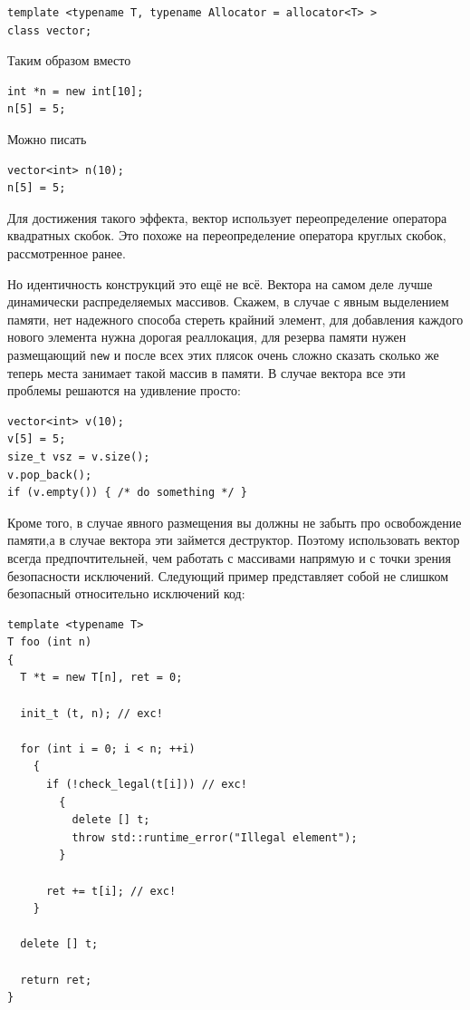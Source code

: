 \documentclass[a4paper,12pt,oneside]{article}
\begin{document}
\begin{lstlisting}
template <typename T, typename Allocator = allocator<T> >
class vector;
\end{lstlisting}

Таким образом вместо

\begin{lstlisting}
int *n = new int[10];
n[5] = 5;
\end{lstlisting}

Можно писать

\begin{lstlisting}
vector<int> n(10);
n[5] = 5;
\end{lstlisting}

Для достижения такого эффекта, вектор использует переопределение оператора квадратных скобок. Это похоже на переопределение оператора круглых скобок, рассмотренное ранее.

Но идентичность конструкций это ещё не всё. Вектора на самом деле лучше динамически распределяемых массивов. Скажем, в случае с явным выделением памяти, нет надежного способа стереть крайний элемент, для добавления каждого нового элемента нужна дорогая реаллокация, для резерва памяти нужен размещающий \lstinline!new! и после всех этих плясок очень сложно сказать сколько же теперь места занимает такой массив в памяти. В случае вектора все эти проблемы решаются на удивление просто:

\begin{lstlisting}
vector<int> v(10);
v[5] = 5;
size_t vsz = v.size();
v.pop_back();
if (v.empty()) { /* do something */ }
\end{lstlisting}

Кроме того, в случае явного размещения вы должны не забыть про освобождение памяти,а  в случае вектора эти займется деструктор. Поэтому использовать вектор всегда предпочтительней, чем работать с массивами напрямую и с точки зрения безопасности исключений. Следующий пример представляет собой не слишком безопасный относительно исключений код:

\begin{lstlisting}
template <typename T>
T foo (int n)
{
  T *t = new T[n], ret = 0;

  init_t (t, n); // exc!
  
  for (int i = 0; i < n; ++i)
    {
      if (!check_legal(t[i])) // exc!
        {
          delete [] t;
          throw std::runtime_error("Illegal element");
        }

      ret += t[i]; // exc!
    }

  delete [] t;

  return ret;
}
\end{lstlisting}
\end{document}
